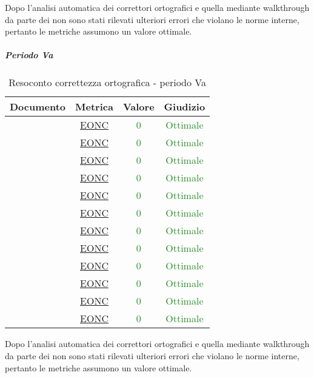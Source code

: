 						Dopo l'analisi automatica dei correttori ortografici e quella mediante walkthrough da parte dei \verificatori{} non sono stati rilevati ulteriori errori che violano le norme interne, pertanto le metriche assumono un valore ottimale.
						
						
						\subparagraph{Periodo Va}
						\begin{table}[H]
							\centering
							\small
							\begin{tabular}{c | c | c | c}
								\hline
								\textbf{Documento} & \textbf{Metrica}    & \textbf{Valore} & \textbf{Giudizio} \\ \hline
								\pdpv        & \hyperref[MLEC]{EONC} & \textcolor{ForestGreen}{0} & \textcolor{ForestGreen}{Ottimale} \\
								\pdqv        & \hyperref[MLEC]{EONC} & \textcolor{ForestGreen}{0} & \textcolor{ForestGreen}{Ottimale} \\
								\ndpv        & \hyperref[MLEC]{EONC} & \textcolor{ForestGreen}{0} & \textcolor{ForestGreen}{Ottimale} \\
								\adrv        & \hyperref[MLEC]{EONC}  & \textcolor{ForestGreen}{0} & \textcolor{ForestGreen}{Ottimale} \\
								\stv		& \hyperref[MLEC]{EONC}  & \textcolor{ForestGreen}{0} & \textcolor{ForestGreen}{Ottimale} \\
								\glv       & \hyperref[MLEC]{EONC} & \textcolor{ForestGreen}{0} & \textcolor{ForestGreen}{Ottimale} \\
								\ddpv        & \hyperref[MLEC]{EONC} & \textcolor{ForestGreen}{0} & \textcolor{ForestGreen}{Ottimale} \\
								\manutv        & \hyperref[MLEC]{EONC} & \textcolor{ForestGreen}{0} & \textcolor{ForestGreen}{Ottimale} \\
								\manmanv        & \hyperref[MLEC]{EONC} & \textcolor{ForestGreen}{0} & \textcolor{ForestGreen}{Ottimale} \\
								\vnovei       & \hyperref[MLEC]{EONC}& \textcolor{ForestGreen}{0} & \textcolor{ForestGreen}{Ottimale} \\
								\vcinquee       & \hyperref[MLEC]{EONC}& \textcolor{ForestGreen}{0} & \textcolor{ForestGreen}{Ottimale} \\
								\vseie       & \hyperref[MLEC]{EONC}& \textcolor{ForestGreen}{0} & \textcolor{ForestGreen}{Ottimale} \\
							\end{tabular}
							\caption{Resoconto correttezza ortografica - periodo Va}
							\label{tab_resoconto_correttezza_ortografica_PVA}
						\end{table}
						Dopo l'analisi automatica dei correttori ortografici e quella mediante walkthrough da parte dei \verificatori{} non sono stati rilevati ulteriori errori che violano le norme interne, pertanto le metriche assumono un valore ottimale.
						\newpage
